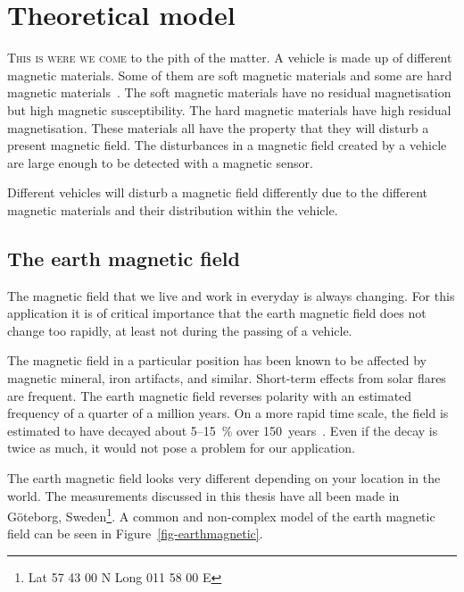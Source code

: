 \cleardoublepage\chapter{Theoretical model}\label{chap:model}

\textsc{This is were we come} to the pith of the matter. A vehicle is made up of different magnetic materials. Some of them are soft magnetic materials and some are hard magnetic materials~\cite{imego2006}. The soft magnetic materials have no residual magnetisation but high magnetic susceptibility. The hard magnetic materials have high residual magnetisation. These materials all have the property that they will disturb a present magnetic field. The disturbances in a magnetic field created by a vehicle are large enough to be detected with a magnetic sensor.

Different vehicles will disturb a magnetic field differently due to the different magnetic materials and their distribution within the vehicle.

\section{The earth magnetic field}
The magnetic field that we live and work in everyday is always changing. For this application it is of critical importance that the earth magnetic field does not change too rapidly, at least not during the passing of a vehicle.

The magnetic field in a particular position has been known to be affected by magnetic mineral, iron artifacts, and similar. Short-term effects from solar flares are frequent. The earth magnetic field reverses polarity with an estimated frequency of a quarter of a million years. On a more rapid time scale, the field is estimated to have decayed about 5--15~\% over 150~years~\cite{nytimes}. Even if the decay is twice as much, it would not pose a problem for our application.

The earth magnetic field looks very different depending on your location in the world. The measurements discussed in this thesis have all been made in G\"{o}teborg, Sweden\footnote{Lat 57 43 00 N Long 011 58 00 E}. A common and non-complex model of the earth magnetic field can be seen in Figure~\ref{fig-earthmagnetic}.

